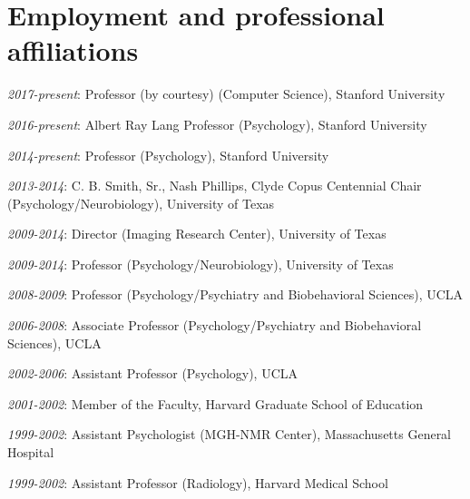 \section*{Employment and professional affiliations}
\noindent

\textit{2017-present}: Professor (by courtesy) (Computer Science), Stanford University

\textit{2016-present}: Albert Ray Lang Professor (Psychology), Stanford University

\textit{2014-present}: Professor (Psychology), Stanford University

\textit{2013-2014}: C. B. Smith, Sr., Nash Phillips, Clyde Copus Centennial Chair (Psychology/Neurobiology), University of Texas

\textit{2009-2014}: Director (Imaging Research Center), University of Texas

\textit{2009-2014}: Professor (Psychology/Neurobiology), University of Texas

\textit{2008-2009}: Professor (Psychology/Psychiatry and Biobehavioral Sciences), UCLA

\textit{2006-2008}: Associate Professor (Psychology/Psychiatry and Biobehavioral Sciences), UCLA

\textit{2002-2006}: Assistant Professor (Psychology), UCLA

\textit{2001-2002}: Member of the Faculty, Harvard Graduate School of Education

\textit{1999-2002}: Assistant Psychologist (MGH-NMR Center), Massachusetts General Hospital

\textit{1999-2002}: Assistant Professor (Radiology), Harvard Medical School

